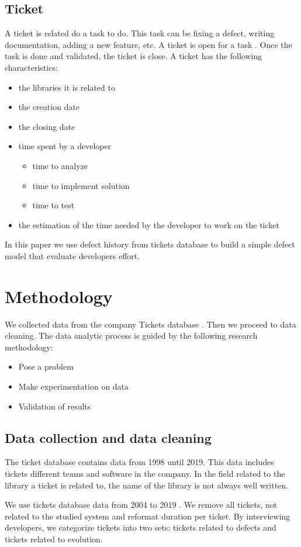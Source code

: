 \documentclass[10pt,conference]{IEEEtran}
\begin{document}
\subsection{Ticket}
A ticket is related do a task to do. 
This task can be fixing a defect, writing documentation, adding a new feature, etc. 
A ticket is open for a task . 
Once the task is done and validated, the ticket is close.
A ticket has the following characteristics:
\begin{itemize}
\item the libraries it  is related to
\item the creation date
\item the closing date
\item time spent by a developer
\begin{itemize}
\item time to analyze
\item time to implement solution
\item time to test
\end{itemize}
\item  the estimation of the time needed by the developer to work on the ticket
\end{itemize}
In this paper we use defect history  from tickets database to build a simple defect model that evaluate developers effort.
\section{Methodology}\label{sec:methodology}
We collected data  from the company Tickets database .  
Then we proceed to data cleaning.
The data analytic process is guided by the following research methodology:
\begin{itemize}
\item Pose a problem
\item Make experimentation on data
\item Validation of results
\end{itemize}
\subsection{Data collection and data cleaning}
The ticket database contains data from 1998  until 2019. 
This data includes tickets  different teams and software in  the company. 
In the field related to the  library a ticket is related to,  the name of the library is not always well written. 

We use tickets database data from 2004 to 2019 . 
We  remove all tickets, not related  to the studied system and reformat duration per ticket.
By interviewing developers, we categorize tickets into two sets: tickets related to defects and tickets related to evolution.
\end{document}
